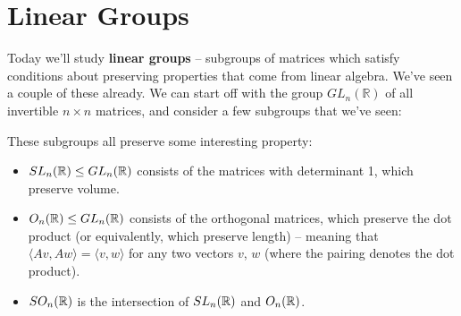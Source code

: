 
\section{Linear Groups}

Today we'll study \textbf{linear groups} -- subgroups of matrices which satisfy conditions about preserving properties that come from linear algebra. We've seen a couple of these already. We can start off with the group $GL_n(\mathbb{R})$ of all invertible $n \times n$ matrices, and consider a few subgroups that we've seen:
\begin{center}
\end{center}
These subgroups all preserve some interesting property:
\begin{itemize}
    \item $SL_n(\mathbb R) \leq GL_n(\mathbb R)$ consists of the matrices with determinant 1, which preserve volume.
    \item $O_n(\mathbb R) \leq GL_n(\mathbb R)$ consists of the orthogonal matrices, which preserve the dot product (or equivalently, which preserve length) -- meaning that $\langle Av, Aw\rangle = \langle v, w\rangle$ for any two vectors $v$, $w$ (where the pairing denotes the dot product). 
    \item $SO_n(\mathbb R)$ is the intersection of $SL_n(\mathbb R)$ and $O_n(\mathbb R)$. 
\end{itemize}

